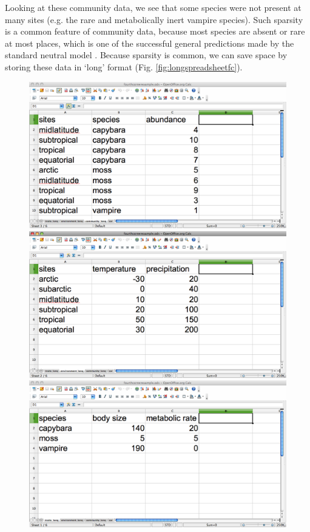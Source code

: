 \documentclass{article}
\numberwithin{exercise}{section}
\begin{document}
Looking at these community data, we see that some species were not present at many sites (e.g. the rare and metabolically inert vampire species).  Such sparsity is a common feature of community data, because most species are absent or rare at most places, which is one of the successful general predictions made by the standard neutral model \citep{Hubbell2001}.  Because sparsity is common, we can save space by storing these data in `long' format (Fig. \ref{fig:longspreadsheetfc}). \begin{figure}
\includegraphics{./readingmultipletables/community_long.png}
\includegraphics{./readingmultipletables/environment_long.png}
\includegraphics{./readingmultipletables/traits_long.png}

\end{figure}
\end{document}
